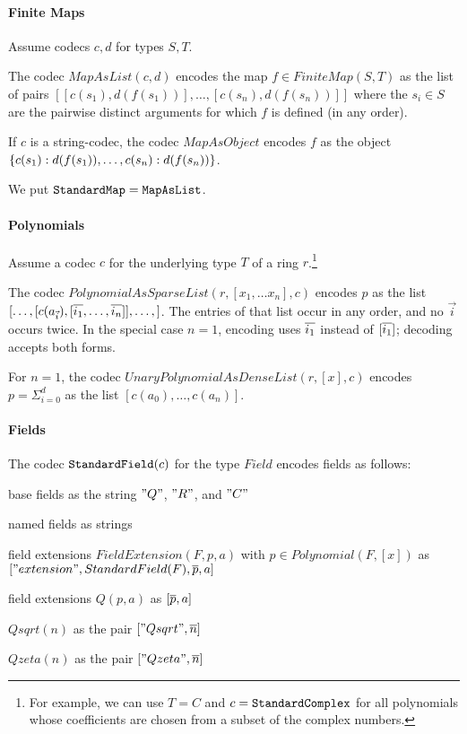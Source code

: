 \paragraph{Finite Maps}
Assume codecs $c,d$ for types $S,T$.

The codec $MapAsList(c,d)$ encodes the map $f\in FiniteMap(S,T)$ as the list of pairs $[[c(s_1),d(f(s_1))],\ldots,[c(s_n),d(f(s_n))]]$ where the $s_i\in S$ are the pairwise distinct arguments for which $f$ is defined (in any order).

If $c$ is a string-codec, the codec $MapAsObject$ encodes $f$ as the object $\jobj{c(s_1):d(f(s_1)),\ldots,c(s_n):d(f(s_n))}$.

We put $\cn{StandardMap}=\cn{MapAsList}$.

\paragraph{Polynomials}
Assume a codec $c$ for the underlying type $T$ of a ring $r$.\footnote{For example, we can use $T=C$ and $c=\cn{StandardComplex}$ for all polynomials whose coefficients are chosen from a subset of the complex numbers.}

The codec $PolynomialAsSparseList(r,[x_1,\ldots x_n],c)$ encodes $p$ as the list $[\ldots,[c(a_{\vec{i}}),[\ov{i_1},\ldots,\ov{i_n}]],\ldots,]$.
The entries of that list occur in any order, and no $\vec{i}$ occurs twice.
In the special case $n=1$, encoding uses $\ov{i_1}$ instead of $[\ov{i_1}]$; decoding accepts both forms.

For $n=1$, the codec $UnaryPolynomialAsDenseList(r,[x],c)$ encodes $p=\Sigma_{i=0}^d$ as the list $[c(a_0),\ldots,c(a_n)]$.

\paragraph{Fields}
The codec $\cn{StandardField}(c)$ for the type $Field$ encodes fields as follows:
\begin{compactitem}
 \item base fields as the string $"Q"$, $"R"$, and $"C"$
 \item named fields as strings
 \item field extensions $FieldExtension(F,p,a)$ with $p\in Polynomial(F,[x])$ as $["extension", StandardField(F), \ov{p}, a]$ 
 \item field extensions $Q(p,a)$ as $[\ov{p},a]$ 
 \item $Qsqrt(n)$ as the pair $["Qsqrt", \ov{n}]$
 \item $Qzeta(n)$ as the pair $["Qzeta", \ov{n}]$
\end{compactitem}

